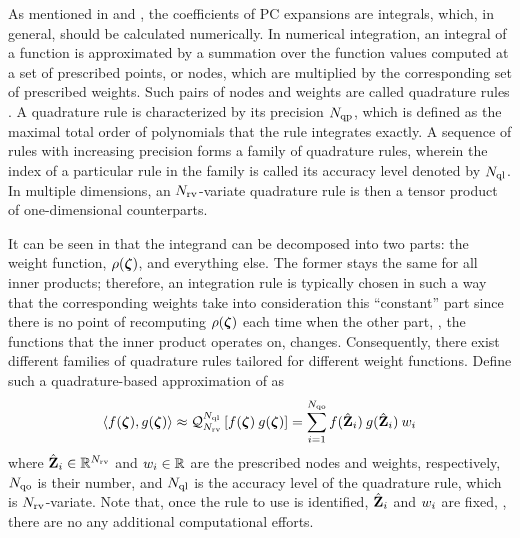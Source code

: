 As mentioned in  and , the coefficients of PC expansions are integrals, which, in general, should be calculated numerically. In numerical integration, an integral of a function is approximated by a summation over the function values computed at a set of prescribed points, or nodes, which are multiplied by the corresponding set of prescribed weights. Such pairs of nodes and weights are called quadrature rules \cite{press2007}. A quadrature rule is characterized by its precision $N_\text{qp}$, which is defined as the maximal total order of polynomials that the rule integrates exactly. A sequence of rules with increasing precision forms a family of quadrature rules, wherein the index of a particular rule in the family is called its accuracy level denoted by $N_\text{ql}$. In multiple dimensions, an ${N_\text{rv}}$-variate quadrature rule is then a tensor product of one-dimensional counterparts.

It can be seen in  that the integrand can be decomposed into two parts: the weight function, $\rho(\boldsymbol{\zeta})$, and everything else. The former stays the same for all inner products; therefore, an integration rule is typically chosen in such a way that the corresponding weights take into consideration this ``constant'' part since there is no point of recomputing $\rho(\boldsymbol{\zeta})$ each time when the other part, \ie, the functions that the inner product operates on, changes. Consequently, there exist different families of quadrature rules tailored for different weight functions. Define such a quadrature-based approximation of  as
\[
  \oInner{f(\vz)}{g(\vz)} \approx \oQuad{\vars}{\qdlevel}{f(\vz) \: g(\vz)} = \sum_{i = 1}^{\qdorder} f(\qdn{\vZ}_i) \: g(\qdn{\vZ}_i) \: \qdw_i
\]
where $\hat{\mathbf{Z}}_i \in \mathbb{R}^{N_\text{rv}}$ and $w_i \in \mathbb{R}$ are the prescribed nodes and weights, respectively, $N_\text{qo}$ is their number, and $N_\text{ql}$ is the accuracy level of the quadrature rule, which is ${N_\text{rv}}$-variate. Note that, once the rule to use is identified, $\hat{\mathbf{Z}}_i$ and $w_i$ are fixed, \ie, there are no any additional computational efforts.


